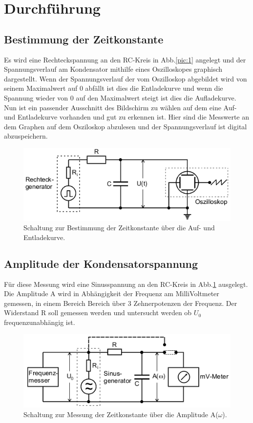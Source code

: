 \section{Durchführung}
\subsection{Bestimmung der Zeitkonstante}
Es wird eine Rechteckspannung an den RC-Kreis in Abb.\ref{pic:1} angelegt und
der Spannungsverlauf am Kondensator mithilfe eines Oszilloskopes
graphisch dargestellt. Wenn der Spannungsverlauf der vom Oszilloskop
abgebildet wird von seinem Maximalwert auf 0 abfällt ist dies die Entladekurve und wenn die Spannung wieder von 0 auf den Maximalwert
steigt ist dies die Aufladekurve.
Nun ist ein passender Ausschnitt des Bildschirm zu wählen auf dem eine Auf- und Entladekurve
vorhanden und gut zu erkennen ist. Hier sind die Messwerte an dem Graphen auf dem Osziloskop abzulesen und der Spannungsverlauf
ist digital abzuspeichern.

\begin{figure}[H]
  \centering
  \includegraphics{content/images/pic2.png}
  \caption{Schaltung zur Bestimmung der Zeitkonstante über die Auf- und Entladekurve.}
  \label{pic:2}
\end{figure}

\subsection{Amplitude der Kondensatorspannung}
Für diese Messung wird eine Sinusspannung an den RC-Kreis in Abb.\ref{pic:2} ausgelegt.
Die Amplitude A wird in Abhängigkeit der Frequenz am MilliVoltmeter gemessen, in einem Bereich
Bereich über 3 Zehnerpotenzen der Frequenz. Der Widerstand R soll gemessen werden und untersucht
werden ob $U_0$ frequenzunabhängig ist.

\begin{figure}[H]
  \centering
  \includegraphics{content/images/pic3.png}
  \caption{Schaltung zur Messung der Zeitkonstante über die Amplitude A($\omega$).}
  \label{pic:3}
\end{figure}


